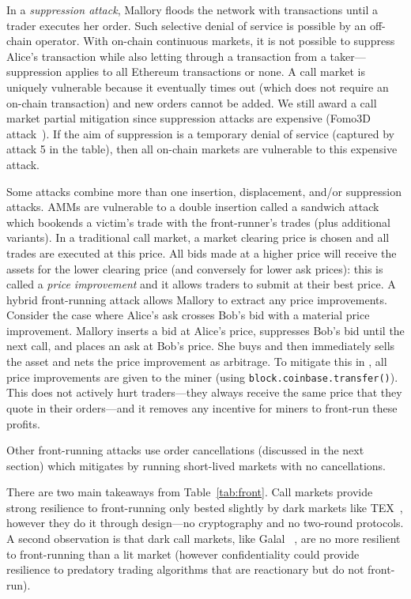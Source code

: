In a \emph{suppression attack}, Mallory floods the network with transactions until a trader executes her order. Such selective denial of service is possible by an off-chain operator. With on-chain continuous markets, it is not possible to suppress Alice's transaction while also letting through a transaction from a taker---suppression applies to all Ethereum transactions or none. A call market is uniquely vulnerable because it eventually times out (which does not require an on-chain transaction) and new orders cannot be added. We still award a call market partial mitigation since suppression attacks are expensive (\cf Fomo3D attack~\cite{eskandari2019sok}). If the aim of suppression is a temporary denial of service (captured by attack 5 in the table), then all on-chain markets are vulnerable to this expensive attack.

Some attacks combine more than one insertion, displacement, and/or suppression attacks. AMMs are vulnerable to a double insertion called a sandwich attack~\cite{ZQFLG21} which bookends a victim's trade with the front-runner's trades (plus additional variants). In a traditional call market, a market clearing price is chosen and all trades are executed at this price. All bids made at a higher price will receive the assets for the lower clearing price (and conversely for lower ask prices): this is called a \textit{price improvement} and it allows traders to submit at their best price. A hybrid front-running attack allows Mallory to extract any price improvements. Consider the case where Alice's ask crosses Bob's bid with a material price improvement. Mallory inserts a bid at Alice's price, suppresses Bob's bid until the next call, and places an ask at Bob's price. She buys and then immediately sells the asset and nets the price improvement as arbitrage. To mitigate this in \cm, all price improvements are given to the miner (using \texttt{block.coinbase.transfer()}). This does not actively hurt traders---they always receive the same price that they quote in their orders---and it removes any incentive for miners to front-run these profits.

Other front-running attacks use order cancellations (discussed in the next section) which \cm mitigates by running short-lived markets with no cancellations.

There are two main takeaways from Table~\ref{tab:front}. Call markets provide strong resilience to front-running only bested slightly by dark markets like TEX~\cite{khalil2019tex}, however they do it through design---no cryptography and no two-round protocols. A second observation is that dark call markets, like Galal \etal~\cite{galalpublicly}, are no more resilient to front-running than a lit market (however confidentiality could provide resilience to predatory trading algorithms that are reactionary but do not front-run).


